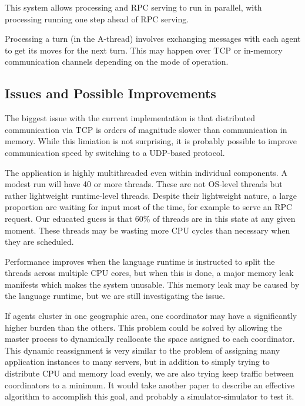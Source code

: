 This system allows processing and RPC serving to run in parallel, with processing running one step
ahead of RPC serving.

Processing a turn (in the A-thread) involves exchanging messages with each agent to get its moves
for the next turn. This may happen over TCP or in-memory communication channels depending on the
mode of operation.

\subsection{Issues and Possible Improvements}

The biggest issue with the current implementation is that distributed communication via TCP is
orders of magnitude slower than communication in memory. While this limiation is not surprising, it
is probably possible to improve communication speed by switching to a UDP-based protocol.

The application is highly multithreaded even within individual components. A modest run will have 40
or more threads. These are not OS-level threads but rather lightweight runtime-level threads.
Despite their lightweight nature, a large proportion are waiting for input most of the time, for
example to serve an RPC request. Our educated guess is that 60\% of threads are in this state at any
given moment. These threads may be wasting more CPU cycles than necessary when they are scheduled.

Performance improves when the language runtime is instructed to split the threads across multiple
CPU cores, but when this is done, a major memory leak manifests which makes the system unusable.
This memory leak may be caused by the language runtime, but we are still investigating the issue.

If agents cluster in one geographic area, one coordinator may have a significantly higher burden
than the others. This problem could be solved by allowing the master process to dynamically
reallocate the space assigned to each coordinator. This dynamic reassignment is very similar
to the problem of assigning many application instances to many servers, but in addition to simply
trying to distribute CPU and memory load evenly, we are also trying keep traffic between coordinators to a minimum. It would take another paper to describe an effective algorithm to accomplish this goal, and probably a simulator-simulator to test it.
